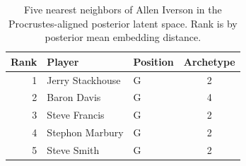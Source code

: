 \begin{table}[htbp]
  \centering\small
  \begin{tabular}{rllc}
    \toprule
    Rank & Player & Position & Archetype \\
    \midrule
    1 & Jerry Stackhouse & G & 2 \\
    2 & Baron Davis & G & 4 \\
    3 & Steve Francis & G & 2 \\
    4 & Stephon Marbury & G & 2 \\
    5 & Steve Smith & G & 2 \\
    \bottomrule
  \end{tabular}
  \caption{Five nearest neighbors of Allen Iverson in the Procrustes-aligned posterior latent space. Rank is by posterior mean embedding distance.}
  \label{tab:Allen_Iverson_neighbors}
\end{table}

